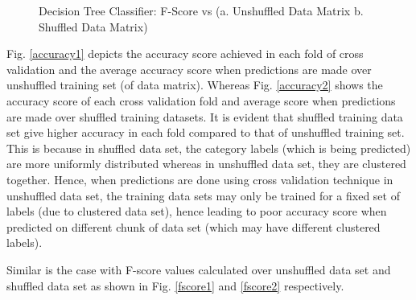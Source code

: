 \documentclass[journal,onecolumn]{IEEEtran}
\begin{document}
\begin{figure}[h]
\begin{center}
\label{thr}
\caption{ Decision Tree Classifier: F-Score vs (a. Unshuffled Data Matrix  b. Shuffled Data Matrix) }

\end{center}
\end{figure}

Fig. \ref{accuracy1} depicts the accuracy score achieved in each fold of cross validation and the average accuracy score when predictions are made over unshuffled training set (of data matrix). Whereas Fig. \ref{accuracy2} shows the accuracy score of each cross validation fold and average score when predictions are made over shuffled training datasets. It is evident that shuffled training data set give higher accuracy in each fold compared to that of unshuffled training set. This is because in shuffled data set,  the category labels (which is being predicted) are more uniformly distributed whereas in unshuffled data set, they are clustered together. Hence, when predictions are done using cross validation technique in unshuffled data set, the training data sets may only be trained for a fixed set of labels (due to clustered data set), hence leading to poor accuracy score when predicted on different chunk of data set (which may have different clustered labels).

Similar is the case with F-score values calculated over unshuffled data set and shuffled data set as shown in Fig. \ref{fscore1} and \ref{fscore2} respectively.
\end{document}
